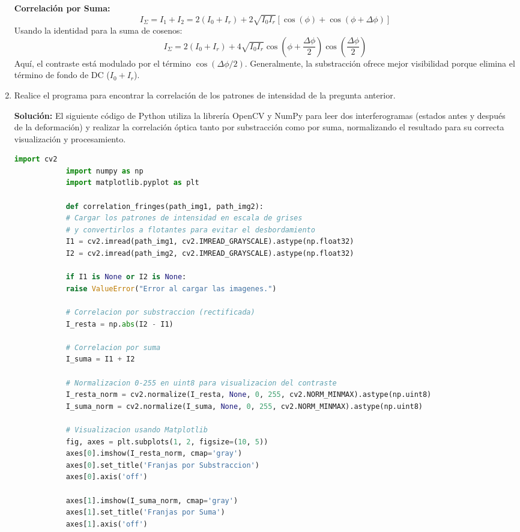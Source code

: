 \documentclass[12pt, letterpaper]{article}
\begin{document}
\begin{enumerate}
		\textbf{Correlación por Suma:}
		$$ I_{\Sigma} = I_1 + I_2 = 2(I_0 + I_r) + 2\sqrt{I_0 I_r} [ \cos(\phi) + \cos(\phi + \Delta\phi) ] $$
		Usando la identidad para la suma de cosenos:
		$$ I_{\Sigma} = 2(I_0 + I_r) + 4\sqrt{I_0 I_r} \cos\left(\phi + \frac{\Delta\phi}{2}\right) \cos\left(\frac{\Delta\phi}{2}\right) $$
		Aquí, el contraste está modulado por el término $\cos(\Delta\phi/2)$. Generalmente, la substracción ofrece mejor visibilidad porque elimina el término de fondo de DC ($I_0 + I_r$).
		
		\item Realice el programa para encontrar la correlación de los patrones de intensidad de la pregunta anterior.
		
		\textbf{Solución:}
		El siguiente código de Python utiliza la librería OpenCV y NumPy para leer dos interferogramas (estados antes y después de la deformación) y realizar la correlación óptica tanto por substracción como por suma, normalizando el resultado para su correcta visualización y procesamiento.
		
		\begin{lstlisting}[language=Python]
			import cv2
			import numpy as np
			import matplotlib.pyplot as plt
			
			def correlation_fringes(path_img1, path_img2):
			# Cargar los patrones de intensidad en escala de grises
			# y convertirlos a flotantes para evitar el desbordamiento
			I1 = cv2.imread(path_img1, cv2.IMREAD_GRAYSCALE).astype(np.float32)
			I2 = cv2.imread(path_img2, cv2.IMREAD_GRAYSCALE).astype(np.float32)
			
			if I1 is None or I2 is None:
			raise ValueError("Error al cargar las imagenes.")
			
			# Correlacion por substraccion (rectificada)
			I_resta = np.abs(I2 - I1)
			
			# Correlacion por suma
			I_suma = I1 + I2
			
			# Normalizacion 0-255 en uint8 para visualizacion del contraste
			I_resta_norm = cv2.normalize(I_resta, None, 0, 255, cv2.NORM_MINMAX).astype(np.uint8)
			I_suma_norm = cv2.normalize(I_suma, None, 0, 255, cv2.NORM_MINMAX).astype(np.uint8)
			
			# Visualizacion usando Matplotlib
			fig, axes = plt.subplots(1, 2, figsize=(10, 5))
			axes[0].imshow(I_resta_norm, cmap='gray')
			axes[0].set_title('Franjas por Substraccion')
			axes[0].axis('off')
			
			axes[1].imshow(I_suma_norm, cmap='gray')
			axes[1].set_title('Franjas por Suma')
			axes[1].axis('off')
			

\end{lstlisting}
\end{enumerate}
\end{document}
